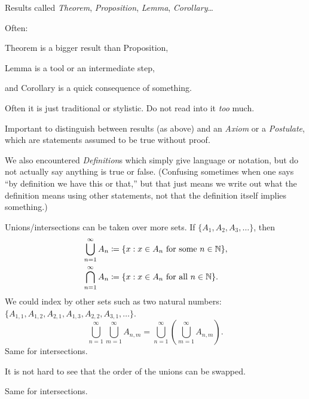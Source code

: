 \documentclass[10pt,aspectratio=149]{beamer}
\begin{document}
\begin{frame}
Results called \emph{Theorem}, \emph{Proposition}, \emph{Lemma},
\emph{Corollary}\ldots

\medskip
\pause

Often:

Theorem is a bigger result than Proposition,

\pause
Lemma is a tool or an intermediate step,

\pause
and Corollary is a quick consequence of something.

\medskip
\pause

Often it is just traditional or stylistic.  Do not read into it
\emph{too} much.

\medskip
\pause

Important to distinguish between results (as above)
and an \emph{Axiom}
or a \emph{Postulate}, which are statements assumed to be true
without proof.

\medskip
\pause

We also encountered \emph{Definition}s which simply give language or
notation, but do not actually say anything is true or false.
\pause
(Confusing sometimes when one says ``by definition we have this or that,''
but that just means we write out what the definition means using other
statements, not that the definition itself implies something.)

\end{frame}

\begin{frame}
Unions/intersections can be taken over more sets.
\pause
If
$\{ A_1, A_2, A_3, \ldots \}$,
\pause
then
\begin{align*}
& \bigcup_{n=1}^\infty A_n \coloneqq \{ x : x \in A_n \text{ for some } n \in {\mathbb{N}}
\} , \\
& \bigcap_{n=1}^\infty A_n \coloneqq \{ x : x \in A_n \text{ for all } n \in {\mathbb{N}}
\} .
\end{align*}
\pause
We could index by other sets such as two natural numbers:
$\{ A_{1,1}, A_{1,2}, A_{2,1}, A_{1,3}, A_{2,2}, A_{3,1}, \ldots \}$.
\pause
\begin{equation*}
\bigcup_{n=1}^\infty \bigcup_{m=1}^\infty A_{n,m}
=
\bigcup_{n=1}^\infty \left( \bigcup_{m=1}^\infty A_{n,m} \right) .
\end{equation*}
\pause
Same for intersections.
\pause

\medskip
It is not hard to see that the order of the unions can be swapped.

Same for intersections.

\end{frame}
\end{document}
